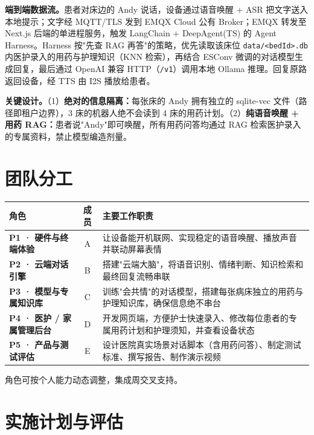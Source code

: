 \documentclass[10pt,a4paper]{article}
\begin{document}
\textbf{端到端数据流。}患者对床边的 Andy 说话，设备通过语音唤醒 + ASR 把文字送入本地提示；文字经 MQTT/TLS 发到 EMQX Cloud 公有 Broker；EMQX 转发至 Next.js 后端的单进程服务，触发 LangChain + DeepAgent(TS) 的 Agent Harness。Harness 按"先查 RAG 再答"的策略，优先读取该床位 \texttt{data/<bedId>.db} 内医护录入的用药与护理知识（KNN 检索），再结合 ESConv 微调的对话模型生成回复，最后通过 OpenAI 兼容 HTTP（\texttt{/v1}）调用本地 Ollama 推理。回复原路返回设备，经 TTS 由 I2S 播放给患者。

\textbf{关键设计。}（1）\textbf{绝对的信息隔离：}每张床的 Andy 拥有独立的 sqlite-vec 文件（路径即租户边界），3 床的机器人绝不会读到 4 床的用药计划。（2）\textbf{纯语音唤醒 + 用药 RAG：}患者说"Andy"即可唤醒，所有用药问答均通过 RAG 检索医护录入的专属资料，禁止模型编造剂量。

\section{团队分工}

\begin{center}
\small
\begin{tabularx}{\textwidth}{|>{\bfseries}p{4.0cm}|c|X|}
\hline
\rowcolor{midgray}
角色 & 成员 & 主要工作职责 \\
\hline
P1 · 硬件与终端体验 & A & 让设备能开机联网、实现稳定的语音唤醒、播放声音并联动屏幕表情 \\
\hline
P2 · 云端对话引擎 & B & 搭建"云端大脑"，将语音识别、情绪判断、知识检索和最终回复流畅串联 \\
\hline
P3 · 模型与专属知识库 & C & 训练"会共情"的对话模型，搭建每张病床独立的用药与护理知识库，确保信息绝不串台 \\
\hline
P4 · 医护 / 家属管理后台 & D & 开发网页端，方便护士快速录入、修改每位患者的专属用药计划和护理须知，并查看设备状态 \\
\hline
P5 · 产品与测试评估 & E & 设计医院真实场景对话脚本（含用药问答）、制定测试标准、撰写报告、制作演示视频 \\
\hline
\end{tabularx}
\end{center}

{\footnotesize 角色可按个人能力动态调整，集成周交叉支持。}

\section{实施计划与评估}
\end{document}
